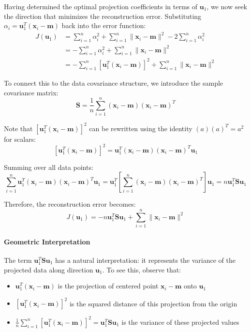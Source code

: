 Having determined the optimal projection coefficients in terms of $\mathbf{u}_1$, we now seek the direction that minimizes the reconstruction error. Substituting $\alpha_{i}=\mathbf{u}_{1}^{T}(\mathbf{x}_{i}-\mathbf{m})$ back into the error function:
\begin{align*}
J(\mathbf{u}_{1})&=\sum_{i=1}^{n}\alpha_{i}^{2}+\sum_{i=1}^{n}\|\mathbf{x}_{i}-\mathbf{m}\|^{2}-2\sum_{i=1}^{n}\alpha_{i}^{2}\\
&=-\sum_{i=1}^{n}\alpha_{i}^{2}+\sum_{i=1}^{n}\|\mathbf{x}_{i}-\mathbf{m}\|^{2}\\
&=-\sum_{i=1}^{n}[\mathbf{u}_{1}^{T}(\mathbf{x}_{i}-\mathbf{m})]^{2}+\sum_{i=1}^{n}\|\mathbf{x}_{i}-\mathbf{m}\|^{2}
\end{align*}

To connect this to the data covariance structure, we introduce the \alert{sample covariance matrix}:
$$
\mathbf{S}=\frac{1}{n}\sum_{i=1}^{n}(\mathbf{x}_{i}-\mathbf{m})(\mathbf{x}_{i}-\mathbf{m})^{T}
$$

Note that $[\mathbf{u}_{1}^{T}(\mathbf{x}_{i}-\mathbf{m})]^{2}$ can be rewritten using the identity $(a)(a)^T = a^2$ for scalars:
$$
[\mathbf{u}_{1}^{T}(\mathbf{x}_{i}-\mathbf{m})]^{2} = \mathbf{u}_{1}^{T}(\mathbf{x}_{i}-\mathbf{m})(\mathbf{x}_{i}-\mathbf{m})^{T}\mathbf{u}_{1}
$$

Summing over all data points:
$$
\sum_{i=1}^{n}\mathbf{u}_{1}^{T}(\mathbf{x}_{i}-\mathbf{m})(\mathbf{x}_{i}-\mathbf{m})^{T}\mathbf{u}_{1}=\mathbf{u}_{1}^{T}\left[\sum_{i=1}^{n}(\mathbf{x}_{i}-\mathbf{m})(\mathbf{x}_{i}-\mathbf{m})^{T}\right]\mathbf{u}_{1}=n\mathbf{u}_{1}^{T}\mathbf{S}\mathbf{u}_{1}
$$

Therefore, the reconstruction error becomes:
$$
J(\mathbf{u}_{1})=-n\mathbf{u}_{1}^{T}\mathbf{S}\mathbf{u}_{1}+\sum_{i=1}^{n}\|\mathbf{x}_{i}-\mathbf{m}\|^{2}
$$

\paragraph{Geometric Interpretation}

The term $\mathbf{u}_{1}^{T}\mathbf{S}\mathbf{u}_{1}$ has a natural interpretation: it represents the \alert{variance of the projected data} along direction $\mathbf{u}_1$. To see this, observe that:
\begin{itemize}
\item $\mathbf{u}_{1}^{T}(\mathbf{x}_{i}-\mathbf{m})$ is the projection of centered point $\mathbf{x}_i - \mathbf{m}$ onto $\mathbf{u}_1$
\item $[\mathbf{u}_{1}^{T}(\mathbf{x}_{i}-\mathbf{m})]^2$ is the squared distance of this projection from the origin
\item $\frac{1}{n}\sum_{i=1}^{n}[\mathbf{u}_{1}^{T}(\mathbf{x}_{i}-\mathbf{m})]^2 = \mathbf{u}_{1}^{T}\mathbf{S}\mathbf{u}_{1}$ is the variance of these projected values
\end{itemize}

